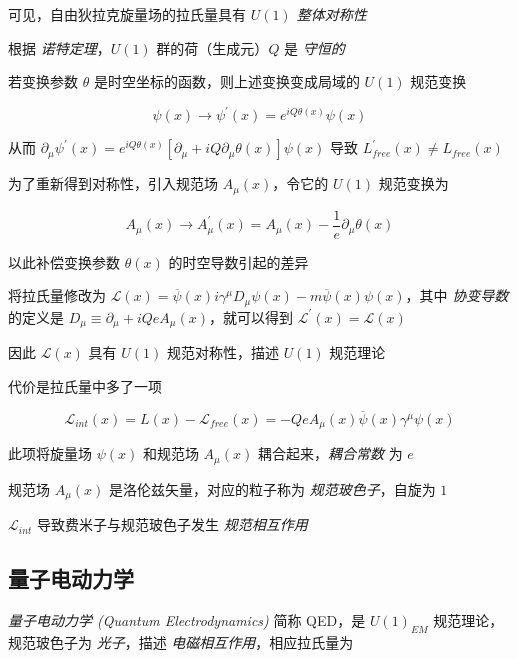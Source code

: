 \documentclass[oneside,a4paper,openany,11pt]{ctexbook}
\begin{document}
可见，自由狄拉克旋量场的拉氏量具有 \emph{$U(1)$ 整体对称性}

根据 \emph{诺特定理}，$U(1)$ 群的荷（生成元）$Q$ 是 \emph{守恒的}

若变换参数 $\theta$ 是时空坐标的函数，则上述变换变成局域的 $U(1)$ 规范变换

\begin{equation}
    \psi(x) \to \psi^\prime(x) = e^{iQ\theta(x)} \psi(x)
\end{equation}

从而 $\partial_\mu \psi^\prime(x)=e^{iQ\theta(x)} [\partial_\mu + iQ \partial_\mu \theta(x)] \psi(x)$ 导致 $L_{free}^\prime(x) \ne L_{free}(x)$

为了重新得到对称性，引入规范场 $A_\mu(x)$，令它的 $U(1)$ 规范变换为

\begin{equation}
    A_\mu(x) \to A^\prime_\mu(x) = A_\mu(x) - \frac{1}{e} \partial_\mu \theta(x)
\end{equation}

以此补偿变换参数 $\theta(x)$ 的时空导数引起的差异

将拉氏量修改为 $\mathcal{L}(x) = \overline{\psi}(x) i\gamma^\mu D_\mu \psi(x) - m \overline{\psi}(x) \psi(x)$，其中 \emph{协变导数} 的定义是 $D_\mu \equiv \partial_\mu + iQ e A_\mu(x)$，就可以得到 $\mathcal{L}^\prime(x) = \mathcal{L}(x)$

因此 $\mathcal{L}(x)$ 具有 $U(1)$ 规范对称性，描述 $U(1)$ 规范理论

代价是拉氏量中多了一项

\begin{equation}
    \mathcal{L}_{int}(x) = L(x) - \mathcal{L}_{free}(x) = -Q e A_\mu(x) \overline{\psi}(x) \gamma^\mu \psi(x)
\end{equation}

此项将旋量场 $\psi(x)$ 和规范场 $A_\mu(x)$ 耦合起来，\emph{耦合常数} 为 $e$

规范场 $A_\mu(x)$ 是洛伦兹矢量，对应的粒子称为 \emph{规范玻色子}，自旋为 $1$

$\mathcal{L}_{int}$ 导致费米子与规范玻色子发生 \emph{规范相互作用}

\subsection{量子电动力学}

\emph{量子电动力学 (Quantum Electrodynamics)} 简称 QED，是 $U(1)_{EM}$ 规范理论，规范玻色子为 \emph{光子}，描述 \emph{电磁相互作用}，相应拉氏量为
\end{document}
